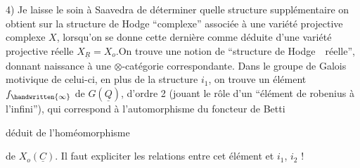 4) Je laisse le soin à Saavedra de déterminer quelle structure supplémentaire on obtient sur la structure de Hodge ``complexe'' associée à une variété projective  complexe $X$, lorsqu'on se donne cette dernière comme déduite d'une variété projective réelle $X_{\underline{R}}=X_o$.On trouve une notion de ``structure de Hodge\ \ réelle'', donnant naissance à une $\otimes$-catégorie correspondante. Dans le groupe de Galois motivique de celui-ci, en plus de la structure $i_1$, on trouve un élément $f_{\handwritten{\infty}}$ de $G(\underline{Q})$,  d'ordre 2 (jouant le rôle d'un ``élément de robenius à l'infini''), qui correspond à l'automorphisme du foncteur de Betti  déduit de l'homéomorphisme  de $X_o(\underline{C})$. Il faut expliciter les relations entre cet élément et $i_1$, $i_2$ !

